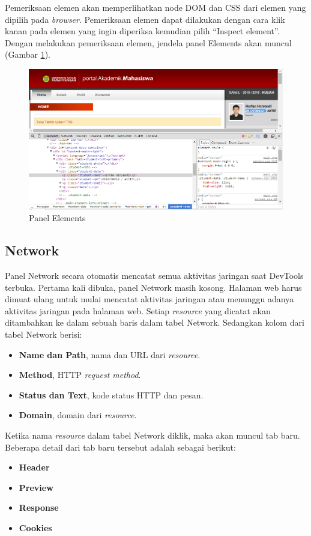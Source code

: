 Pemeriksaan elemen akan memperlihatkan node DOM dan CSS dari elemen yang dipilih pada \textit{browser}. Pemeriksaan elemen dapat dilakukan dengan cara klik kanan pada elemen yang ingin diperiksa kemudian pilih "`Inspect element"'. Dengan melakukan pemeriksaan elemen, jendela panel Elements akan muncul (Gambar \ref{fig:2_elements_panel}). 

\begin{figure}[H]
	\centering
	\includegraphics[scale=0.5]{Gambar/elements-panel}
	\caption{Panel Elements} 
	\label{fig:2_elements_panel}
\end{figure}

\subsection{Network}
Panel Network secara otomatis mencatat semua aktivitas jaringan saat DevTools terbuka. Pertama kali dibuka, panel Network masih kosong. Halaman web harus dimuat ulang untuk mulai mencatat aktivitas jaringan atau menunggu adanya aktivitas jaringan pada halaman web. Setiap \textit{resource} yang dicatat akan ditambahkan ke dalam sebuah baris dalam tabel Network. Sedangkan kolom dari tabel Network berisi:
\begin{itemize}
	\item \textbf{Name dan Path}, nama dan URL dari \textit{resource}.
	\item \textbf{Method}, HTTP \textit{request method}.
	\item \textbf{Status dan Text}, kode status HTTP dan pesan.
	\item \textbf{Domain}, domain dari \textit{resource}.
\end{itemize}


Ketika nama \textit{resource} dalam tabel Network diklik, maka akan muncul tab baru. Beberapa detail dari tab baru tersebut adalah sebagai berikut:
\begin{itemize}
	\item \textbf{Header}\\
	\item \textbf{Preview}\\
	\item \textbf{Response}\\
	\item \textbf{Cookies}\\
\end{itemize}

